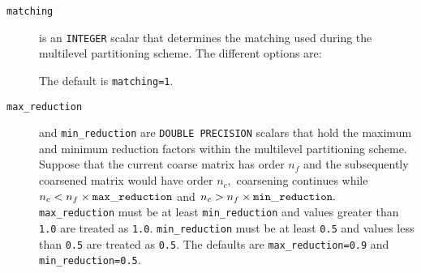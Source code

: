 \begin{description}

\item[\texttt{matching}] is an {\tt INTEGER} scalar that determines the matching used during the multilevel partitioning scheme. The different options are: 
The default is {\tt matching=1}.



\item[\texttt{max\_reduction}] and {\tt min\_reduction} are {\tt DOUBLE PRECISION} scalars that hold the maximum and minimum reduction factors within the multilevel partitioning scheme. Suppose that the current coarse matrix has order $n_f$ and 
the subsequently coarsened matrix would have order $n_c,$ coarsening continues while $n_c<n_f\times{\tt max\_reduction}$ and 
$n_c>n_f\times{\tt min\_reduction}.$ {\tt max\_reduction} must be at least {\tt min\_reduction} and values greater than 
{\tt 1.0} are treated as {\tt 1.0}. {\tt min\_reduction} must be at least {\tt 0.5} and values less than 
{\tt 0.5} are treated as {\tt 0.5}. The defaults are {\tt max\_reduction=0.9} and {\tt min\_reduction=0.5}.












\end{description}
